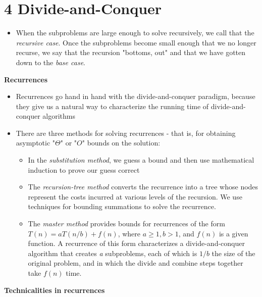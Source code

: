 \documentclass{report}
\begin{document}
\section*{4 Divide-and-Conquer}
\begin{itemize}
    \item When the subproblems are large enough to solve recursively, we call that the \textit{recursive case}. Once the subproblems become small enough that we no longer recurse, we say that the recursion "bottoms, out" and that we have gotten down to the \textit{base case}.
\end{itemize}
\textbf{Recurrences}
\begin{itemize}
    \item Recurrences go hand in hand with the divide-and-conquer paradigm, because they give us a natural way to characterize the running time of divide-and-conquer algorithms
    \item There are three methods for solving recurrences - that is, for obtaining asymptotic "$\Theta$" or "$O$" bounds on the solution:
    \begin{itemize}
        \item In the \textit{substitution method}, we guess a bound and then use mathematical induction to prove our guess correct
        \item The \textit{recursion-tree method} converts the recurrence into a tree whose nodes represent the costs incurred at various levels of the recursion. We use techniques for bounding summations to solve the recurrence.
        \item The \textit{master method} provides bounds for recurrences of the form $T(n) = aT(n/b) + f(n)$, where $a \geq 1, b > 1$, and $f(n)$ is a given function. A recurrence of this form characterizes a divide-and-conquer algorithm that creates \textit{a} subproblems, each of which is $1/b$ the size of the original problem, and in which the divide and combine steps together take $f(n)$ time.
    \end{itemize}
\end{itemize}
\textbf{Technicalities in recurrences}
\end{document}
